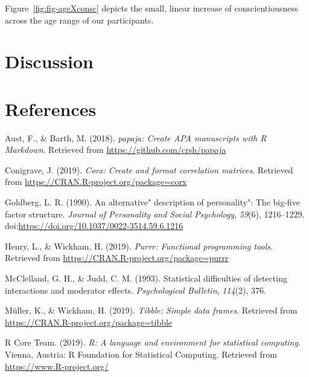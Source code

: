 \documentclass[
  man,floatsintext]{apa6}
\begin{document}
Figure~\ref{fig:fig-ageXconsc} depicts the small, linear increase of conscientiousness across the age range of our participants.

\hypertarget{discussion}{%
\section{Discussion}\label{discussion}}

\newpage

\hypertarget{references}{%
\section{References}\label{references}}

\begingroup
\setlength{\parindent}{-0.5in}
\setlength{\leftskip}{0.5in}

\hypertarget{refs}{}
\leavevmode\hypertarget{ref-R-papaja}{}%
Aust, F., \& Barth, M. (2018). \emph{papaja: Create APA manuscripts with R Markdown}. Retrieved from \url{https://github.com/crsh/papaja}

\leavevmode\hypertarget{ref-R-corx}{}%
Conigrave, J. (2019). \emph{Corx: Create and format correlation matrices}. Retrieved from \url{https://CRAN.R-project.org/package=corx}

\leavevmode\hypertarget{ref-goldberg1990alternative}{}%
Goldberg, L. R. (1990). An alternative" description of personality": The big-five factor structure. \emph{Journal of Personality and Social Psychology}, \emph{59}(6), 1216--1229. doi:\href{https://doi.org/https://doi.org/10.1037/0022-3514.59.6.1216}{https://doi.org/10.1037/0022-3514.59.6.1216}

\leavevmode\hypertarget{ref-R-purrr}{}%
Henry, L., \& Wickham, H. (2019). \emph{Purrr: Functional programming tools}. Retrieved from \url{https://CRAN.R-project.org/package=purrr}

\leavevmode\hypertarget{ref-mcclelland1993statistical}{}%
McClelland, G. H., \& Judd, C. M. (1993). Statistical difficulties of detecting interactions and moderator effects. \emph{Psychological Bulletin}, \emph{114}(2), 376.

\leavevmode\hypertarget{ref-R-tibble}{}%
Müller, K., \& Wickham, H. (2019). \emph{Tibble: Simple data frames}. Retrieved from \url{https://CRAN.R-project.org/package=tibble}

\leavevmode\hypertarget{ref-R-base}{}%
R Core Team. (2019). \emph{R: A language and environment for statistical computing}. Vienna, Austria: R Foundation for Statistical Computing. Retrieved from \url{https://www.R-project.org/}
\end{document}
